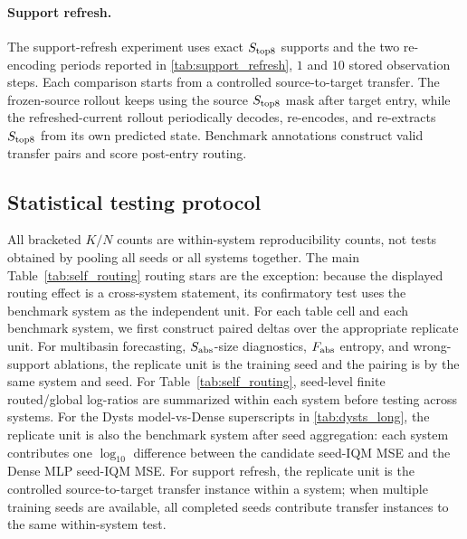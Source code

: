 

\paragraph{Support refresh.}
The support-refresh experiment uses exact \(S_{\rm top8}\) supports and the two re-encoding periods reported in \cref{tab:support_refresh}, $1$ and $10$ stored observation steps. Each comparison starts from a controlled source-to-target transfer. The frozen-source rollout keeps using the source \(S_{\rm top8}\) mask after target entry, while the refreshed-current rollout periodically decodes, re-encodes, and re-extracts \(S_{\rm top8}\) from its own predicted state. Benchmark annotations construct valid transfer pairs and score post-entry routing.

\subsection{Statistical testing protocol}
\label{app:statistical_testing}
All bracketed \(K/N\) counts are within-system reproducibility counts, not tests obtained by pooling all seeds or all systems together. The main Table~\ref{tab:self_routing} routing stars are the exception: because the displayed routing effect is a cross-system statement, its confirmatory test uses the benchmark system as the independent unit. For each table cell and each benchmark system, we first construct paired deltas over the appropriate replicate unit. For multibasin forecasting, \(S_{\rm abs}\)-size diagnostics, \(F_{\rm abs}\) entropy, and wrong-support ablations, the replicate unit is the training seed and the pairing is by the same system and seed. For Table~\ref{tab:self_routing}, seed-level finite routed/global log-ratios are summarized within each system before testing across systems. For the Dysts model-vs-Dense superscripts in \cref{tab:dysts_long}, the replicate unit is also the benchmark system after seed aggregation: each system contributes one \(\log_{10}\) difference between the candidate seed-IQM MSE and the Dense MLP seed-IQM MSE. For support refresh, the replicate unit is the controlled source-to-target transfer instance within a system; when multiple training seeds are available, all completed seeds contribute transfer instances to the same within-system test.

